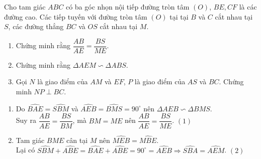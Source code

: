 \begin{ex}%
    Cho tam giác $ABC$ có ba góc nhọn nội tiếp đường tròn tâm $(O)$, $BE, CF$ là các đường cao. Các tiếp tuyến với đường tròn tâm $(O)$ tại tại $B$ và $C$ cắt nhau tại $S$, các đường thẳng $BC$ và $OS$ cắt nhau tại $M$.
    \begin{enumerate}
        \item Chứng minh rằng $\dfrac{AB}{AE}= \dfrac{BS}{ME}$.
        \item Chứng minh rằng $\Delta AEM \backsim \Delta ABS$.
        \item Gọi $N$ là giao điểm của $AM$ và $EF$, $P$ là giao điểm của $AS$ và $BC$. Chứng minh $NP \perp BC$.
    \end{enumerate}
\loigiai
    {
    \begin{center}
    \end{center}
    \begin{enumerate}
        \item Do $\widehat{BAE}= \widehat{SBM}$ và $\widehat{AEB}= \widehat{BMS}= 90^\circ$ nên $\Delta AEB \backsim \Delta BMS$.\\
        Suy ra $\dfrac{AB}{AE}= \dfrac{BS}{BM}$, mà $BM=ME$ nên $\dfrac{AB}{AE}= \dfrac{BS}{ME}$. $(1)$ 
        \item Tam giác $BME$ cân tại $M$ nên $\widehat{MEB}= \widehat{MBE}$.\\
        Lại có $\widehat{SBM}+ \widehat{ABE}= \widehat{BAE}+ \widehat{ABE}= 90^\circ= \widehat{AEB} \Rightarrow \widehat{SBA}= \widehat{AEM}$. $(2)$\\

\end{enumerate}}
\end{ex}
